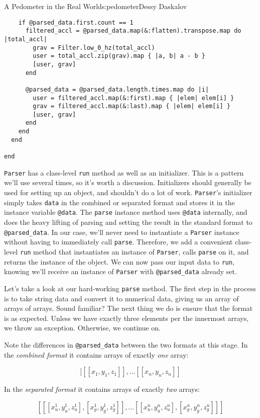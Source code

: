 \begin{aosachapter}{A Pedometer in the Real World}{s:pedometer}{Dessy Daskalov}
\begin{verbatim}
    if @parsed_data.first.count == 1
      filtered_accl = @parsed_data.map(&:flatten).transpose.map do |total_accl|
        grav = Filter.low_0_hz(total_accl)
        user = total_accl.zip(grav).map { |a, b| a - b }
        [user, grav]
      end

      @parsed_data = @parsed_data.length.times.map do |i|
        user = filtered_accl.map(&:first).map { |elem| elem[i] }
        grav = filtered_accl.map(&:last).map { |elem| elem[i] }
        [user, grav]
      end
    end
  end

end
\end{verbatim}

\texttt{Parser} has a class-level \texttt{run} method as well as an
initializer. This is a pattern we'll use several times, so it's worth a
discussion. Initializers should generally be used for setting up an
object, and shouldn't do a lot of work. \texttt{Parser}'s initializer
simply takes \texttt{data} in the combined or separated format and
stores it in the instance variable \texttt{@data}. The \texttt{parse}
instance method uses \texttt{@data} internally, and does the heavy
lifting of parsing and setting the result in the standard format to
\texttt{@parsed\_data}. In our case, we'll never need to instantiate a
\texttt{Parser} instance without having to immediately call
\texttt{parse}. Therefore, we add a convenient class-level \texttt{run}
method that instantiates an instance of \texttt{Parser}, calls
\texttt{parse} on it, and returns the instance of the object. We can now
pass our input data to \texttt{run}, knowing we'll receive an instance
of \texttt{Parser} with \texttt{@parsed\_data} already set.

Let's take a look at our hard-working \texttt{parse} method. The first
step in the process is to take string data and convert it to numerical
data, giving us an array of arrays of arrays. Sound familiar? The next
thing we do is ensure that the format is as expected. Unless we have
exactly three elements per the innermost arrays, we throw an exception.
Otherwise, we continue on.

Note the differences in \texttt{@parsed\_data} between the two formats
at this stage. In the \emph{combined format} it contains arrays of
exactly \emph{one} array:

\[
[[[x_1, y_1, z_1]], \ldots [[x_n, y_n, z_n]]
\]

In the \emph{separated format} it contains arrays of exactly \emph{two}
arrays:

\[[[[x_{u}^1,y_{u}^1,z_{u}^1], [x_{g}^1,y_{g}^1,z_{g}^1]], ... [[x_{u}^n,y_{u}^n,z_{u}^n], [x_{g}^n,y_{g}^n,z_{g}^n]]]\]


\end{aosachapter}
